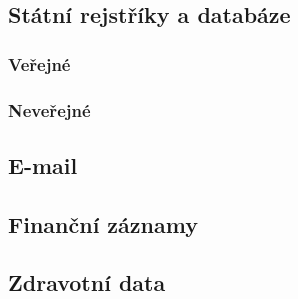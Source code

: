 \subsection{Státní rejstříky a databáze}
\subsubsection{Veřejné}
\subsubsection{Neveřejné}

\subsection{E-mail}

\subsection{Finanční záznamy}

\subsection{Zdravotní data}
